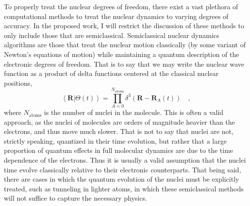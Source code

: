 \documentclass[12pt]{article}
\newcommand{\inner}[2]{\left\langle #1 \left\vert\right. #2 \right\rangle}            %
\newcommand*\vc[1]{\boldsymbol{#1}}
\begin{document}
To properly treat the nuclear degrees of freedom, there exist a vast plethora
of computational methods to treat the nuclear dynamics to varying degrees of
accuracy. In the proposed work, I will restrict the discussion of these methods
to only include those that are semiclassical. Semiclassical nuclear dynamics
algorithms are those that treat the nuclear motion classically (by some variant
of Newton's equations of motion) while maintaining a quantum description of the
electronic degrees of freedom. That is to say that we may write the nuclear 
wave function as a product of delta functions centered at the classical nuclear
positions,
\begin{equation}
\inner{\vc{R}}{\Theta (t)} = 
  \prod_{A = 0}^{N_\mathrm{atoms}} \delta^3(\vc{R} - \vc{R}_A(t))
  \quad,
  \label{eq:ClassicalNuclei}
\end{equation}
where $N_\mathrm{atoms}$ is the number of nuclei in the molecule.  This is
often a valid approach, as the nuclei of molecules are orders of magnitude
heavier than the electrons, and thus move much slower. That is not to say that
nuclei are not, strictly speaking, quantized in their time evolution, but
rather that a large proportion of quantum effects in full molecular dynamics
are due to the time dependence of the electrons. Thus it is usually a valid
assumption that the nuclei time evolve classically relative to their electronic
counterparts. That being said, there are cases in which the quantum evolution
of the nuclei must be explicitly treated, such as tunneling in lighter atoms,
in which these semiclassical methods will not suffice to capture the necessary
physics.
\end{document}
